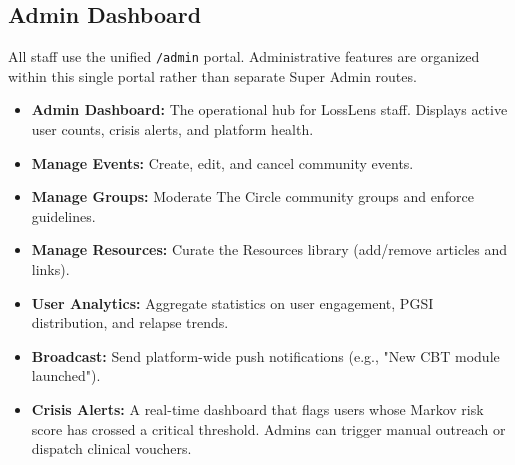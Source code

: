 \documentclass[11pt,a4paper]{article}
\begin{document}
\subsection{Admin Dashboard}
All staff use the unified \texttt{/admin} portal. Administrative features are organized within this single portal rather than separate Super Admin routes.
\begin{itemize}
    \item \textbf{Admin Dashboard:} The operational hub for LossLens staff. Displays active user counts, crisis alerts, and platform health.
    \item \textbf{Manage Events:} Create, edit, and cancel community events.
    \item \textbf{Manage Groups:} Moderate The Circle community groups and enforce guidelines.
    \item \textbf{Manage Resources:} Curate the Resources library (add/remove articles and links).
    \item \textbf{User Analytics:} Aggregate statistics on user engagement, PGSI distribution, and relapse trends.
    \item \textbf{Broadcast:} Send platform-wide push notifications (e.g., "New CBT module launched").
    \item \textbf{Crisis Alerts:} A real-time dashboard that flags users whose Markov risk score has crossed a critical threshold. Admins can trigger manual outreach or dispatch clinical vouchers.
\end{itemize}
\end{document}
